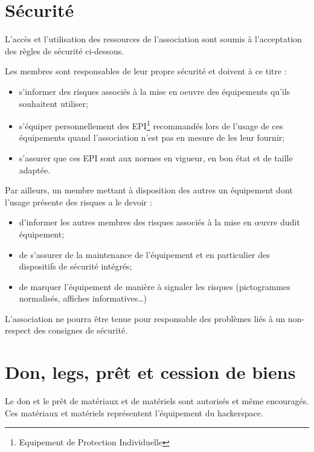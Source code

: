 \documentclass[a4paper, 11pt]{article}
\begin{document}

\section{Sécurité} %

L'accès et l'utilisation des ressources de l'association sont soumis à l'acceptation des règles de sécurité ci-dessous.

Les membres sont responsables de leur propre sécurité et doivent à ce titre :

\begin{itemize}
    \item s'informer des risques associés à la mise en oeuvre des équipements qu'ils souhaitent utiliser;
    \item s'équiper personnellement des EPI\footnote{Equipement de Protection Individuelle} recommandés lors de l'usage
        de ces équipements quand l'association n'est pas en mesure de les leur fournir;
    \item s'assurer que ces EPI sont aux normes en vigueur, en bon état et de taille adaptée.
\end{itemize}

Par ailleurs, un membre mettant à disposition des autres un équipement dont l'usage présente des risques a le devoir :

\begin{itemize}
    \item d'informer les autres membres des risques associés à la mise en œuvre dudit équipement;
    \item de s'assurer de la maintenance de l'équipement et en particulier des dispositifs de sécurité intégrés;
    \item de marquer l'équipement de manière à signaler les risques (pictogrammes normalisés, affiches
        informatives\dots)
\end{itemize}

L'association ne pourra être tenue pour responsable des problèmes liés à un non-respect des consignes de sécurité.


\section{Don, legs, prêt et cession de biens} %

Le don et le prêt de matériaux et de matériels sont autorisés et même encouragés. Ces matériaux et matériels représentent l'équipement du hackerspace.
\end{document}
